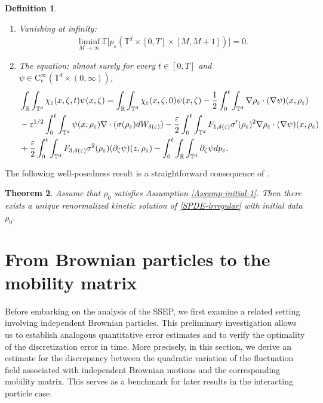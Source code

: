 \documentclass[UTF-8,reqno]{amsart}
\numberwithin{equation}{section}
\newtheorem{theorem}{Theorem}[section]
\newtheorem{definition}[theorem]{Definition}
\begin{document}
\begin{definition}
\begin{enumerate}
		\item Vanishing at infinity:
		\begin{align}\label{control CKM VI}
		\liminf_{M\to \infty}\mathbb{E}\Big[p_{\varepsilon}(\mathbb{T}^{d}\times [0,T]\times [M,M+1])\Big]=0.
		\end{align}
		\item The equation: almost surely for every $t\in[0,T]$ and $\psi\in\mathrm{C}_{c}^{\infty}\left(\mathbb{T}^{d}\times(0,\infty)\right)$,
	\begin{align}\label{MC kenitic solution}
&\int_{\mathbb{R}}\int_{\mathbb{T}^{d}} \chi_{\varepsilon}(x, \zeta, t) \psi(x, \zeta)=\int_{\mathbb{R}} \int_{\mathbb{T}^{d}} \chi_{\varepsilon}(x, \zeta, 0)  \psi(x, \zeta)-\frac{1}{2}\int_{0}^{t} \int_{\mathbb{T}^{d}}\nabla\rho_{\varepsilon}\cdot(\nabla\psi)(x,\rho_{\varepsilon})\notag\\
&-\varepsilon^{1/2}\int^t_0\int_{\mathbb{T}^{d}}\psi(x,\rho_{\varepsilon})\nabla\cdot(\sigma(\rho_{\varepsilon})dW_{\delta(\varepsilon)})-\frac{\varepsilon}{2}\int^t_0\int_{\mathbb{T}^{d}}F_{1,\delta(\varepsilon)}\sigma'(\rho_{\varepsilon})^2\nabla\rho_{\varepsilon}\cdot(\nabla\psi)(x,\rho_{\varepsilon})\notag\\
&+\frac{\varepsilon}{2}\int^t_0\int_{\mathbb{T}^{d}}F_{3,\delta(\varepsilon)}\sigma^2(\rho_{\varepsilon})(\partial_{\zeta}\psi)(z,\rho_{\varepsilon})-\int^t_0\int_{\mathbb{R}}\int_{\mathbb{T}^{d}}\partial_{\zeta}\psi dp_{\varepsilon}. 
\end{align}
\end{enumerate}			
\end{definition}
The following well-posedness result is a straightforward consequence of \cite{FG24}.  
\begin{theorem}
Assume that $\rho_0$ satisfies Assumption \ref{Assump-initial-1}. Then there exists a unique renormalized kinetic solution of \eqref{SPDE-irregular} with initial data $\rho_0$. 
\end{theorem}







\section{From Brownian particles to the mobility matrix}\label{sec-3}
Before embarking on the analysis of the SSEP, we first examine a related setting involving independent Brownian particles. This preliminary investigation allows us to establish analogous quantitative error estimates and to verify the optimality of the discretization error in time. More precisely, in this section, we derive an estimate for the discrepancy between the quadratic variation of the fluctuation field associated with independent Brownian motions and the corresponding mobility matrix. This serves as a benchmark for later results in the interacting particle case.
\end{document}
